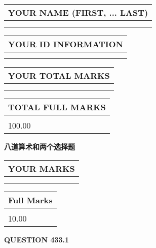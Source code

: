 \documentclass{ctexart}
\begin{document}
   
   
   
\newpage 
\setcounter{page}{ 
   433001 } 
   
   
   
   
\noindent\begin{tabular}{|l|}
\hline
YOUR NAME (FIRST, ... LAST)  \\
\hline
 \\ 
 \\ 
\hline
\end{tabular}
\hspace{0.05in} \begin{tabular}{|l|}
\hline
 YOUR   ID   INFORMATION  \\
\hline
 \\ 
 \\ 
\hline
\end{tabular}
   
   
\vspace{0.2in}\noindent\begin{tabular}{|l|}
\hline
YOUR TOTAL MARKS  \\
\hline
 \\ 
 \\ 
\hline
\end{tabular}
\hspace{0.05in} \begin{tabular}{|l|}
\hline
TOTAL FULL MARKS  \\
\hline
 \\ 
100.00 \\
\hline
\end{tabular}
   
   
 \vspace{0.2in}
{\LARGE {\textbf{ 八道算术和两个选择题}}}
   
   
  
\vspace{0.2in}
  
\noindent\begin{tabular}{|l|}
\hline
 YOUR MARKS  \\
\hline
 \\ 
 \\ 
\hline
\end{tabular}
\hspace{0.05in} \begin{tabular}{|l|}
\hline
 Full Marks  \\
\hline
 \\ 
10.00 \\
\hline
\end{tabular}
{\textbf{\Large{QUESTION
433.1 
}}}
  
\end{document}
